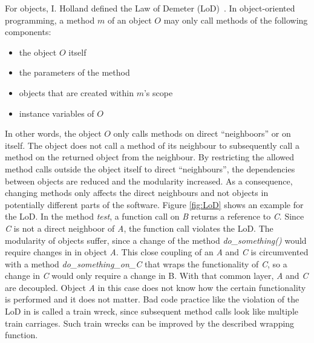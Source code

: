 For objects, I. Holland defined the Law of Demeter (LoD)~\cite{lieberherr_assuring_1989}.
In object-oriented programming, a method $m$ of an object $O$ may only call methods of the following components:
\begin{itemize}
    \item the object $O$ itself
    \item the parameters of the method
    \item objects that are created within $m$'s scope
    \item instance variables of $O$
\end{itemize}
In other words, the object $O$ only calls methods on direct \enquote{neighboors} or on itself. The object does not call a method of its neighbour to subsequently call a method on the returned object from the neighbour. By restricting the allowed method calls outside the object itself to direct \enquote{neighbours}, the dependencies between objects are reduced and the modularity increased. As a consequence, changing methods only affects the direct neighbours and not objects in potentially different parts of the software. 
Figure \ref{fig:LoD} shows an example for the LoD. In the method \textit{test}, a function call on \textit{B} returns a reference to \textit{C}. Since \textit{C} is not a direct neighboor of \textit{A}, the function call violates the LoD. The modularity of objects suffer, since a change of the method \textit{do\_something()} would require changes in in object \textit{A}. This close coupling of an \textit{A} and \textit{C} is circumvented with a method \textit{do\_something\_on\_C} that wraps the functionality of \textit{C}, so a change in \textit{C} would only require a change in B. With that common layer, \textit{A} and \textit{C} are decoupled. Object \textit{A} in this case does not know how the certain functionality is performed and it does not matter.  
Bad code practice like the violation of the LoD in  is called a train wreck, since subsequent method calls look like multiple train carriages. Such train wrecks can be improved  by the described wrapping function.

